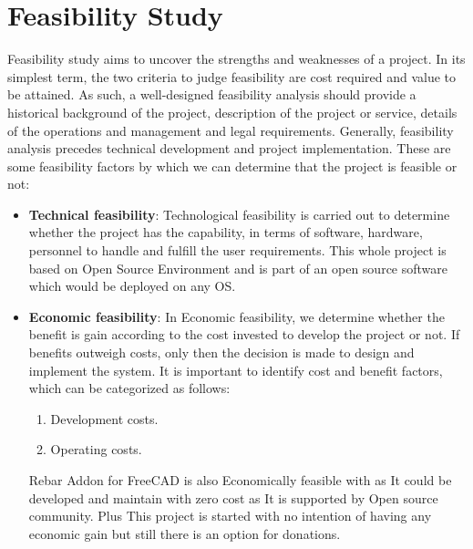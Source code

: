 \section{Feasibility Study}
Feasibility study aims to uncover the strengths and weaknesses of
a project. In its simplest term, the two criteria to judge feasibility
are cost required and value to be attained. As such, a well-designed
feasibility analysis should provide a historical background of the
project, description of the project or service, details of the
operations and management and legal requirements. Generally, feasibility
analysis precedes technical development and project implementation.
These are some feasibility factors by which we can determine that
the project is feasible or not:
\begin{itemize}
\item {\bf{Technical feasibility}}: Technological feasibility is carried
out to determine whether the project has the capability, in terms of
software, hardware, personnel to handle and fulfill the user requirements. This whole project is based on Open
Source Environment and is part of an open source software which would be deployed on any OS.

\item {\bf{Economic feasibility}}: In Economic feasibility, we
determine whether the benefit is gain according to the cost invested
to develop the project or not. If benefits outweigh costs, only then
the decision is made to design and implement the system. It is
important to identify cost and benefit factors, which can be categorized
as follows:
\begin{enumerate}
\item Development costs.
\item Operating costs.
\end{enumerate}
Rebar Addon for FreeCAD is also Economically feasible with as It could be developed and maintain with zero cost as It is supported by Open source community.
Plus This project is started with no intention of having any economic gain but still there is an option for donations.

\end{itemize}


